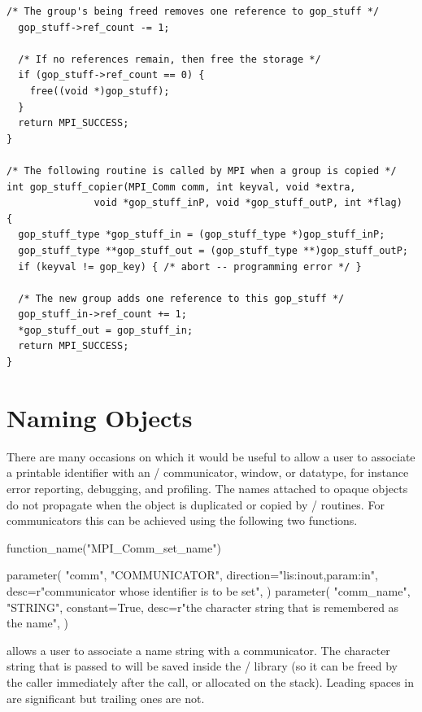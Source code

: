 \begin{lstlisting}[language={[MPI]C}]
  /* The group's being freed removes one reference to gop_stuff */
  gop_stuff->ref_count -= 1;

  /* If no references remain, then free the storage */
  if (gop_stuff->ref_count == 0) {
    free((void *)gop_stuff);
  }
  return MPI_SUCCESS;
}

/* The following routine is called by MPI when a group is copied */
int gop_stuff_copier(MPI_Comm comm, int keyval, void *extra, 
               void *gop_stuff_inP, void *gop_stuff_outP, int *flag)
{
  gop_stuff_type *gop_stuff_in = (gop_stuff_type *)gop_stuff_inP;
  gop_stuff_type **gop_stuff_out = (gop_stuff_type **)gop_stuff_outP;
  if (keyval != gop_key) { /* abort -- programming error */ }

  /* The new group adds one reference to this gop_stuff */
  gop_stuff_in->ref_count += 1;
  *gop_stuff_out = gop_stuff_in;
  return MPI_SUCCESS;
}
\end{lstlisting}

 
\section{Naming Objects}
\label{sec:ei-naming}

There are many occasions on which it would be useful to allow a user
to associate a printable identifier with an \MPI/ communicator, window, or
datatype, for instance error reporting, debugging, and profiling.
The names attached to opaque objects do not propagate when the object
is duplicated or copied by \mpi/ routines.
For communicators this can be achieved using the following two
functions.

\begin{mpi-binding}
    function_name("MPI_Comm_set_name")
    
    parameter(
        "comm",
        "COMMUNICATOR",
        direction="lis:inout,param:in",
        desc=r"communicator whose identifier is to be set",
    )
    parameter(
        "comm_name",
        "STRING",
        constant=True,
        desc=r"the character string that is remembered as the name",
    )
\end{mpi-binding}

 allows a user to associate a name
string with a communicator. The character string that is passed to
 will be saved inside the \MPI/
library (so it can be freed by the caller immediately after the call, or
allocated on the stack).
Leading spaces in  are
significant but trailing ones are not.

